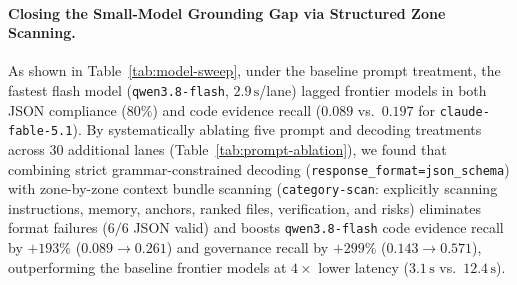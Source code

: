 \documentclass[11pt]{article}
\begin{document}
\paragraph{Closing the Small-Model Grounding Gap via Structured Zone Scanning.}
As shown in Table~\ref{tab:model-sweep}, under the baseline prompt treatment, the fastest flash model (\texttt{qwen3.8-flash}, $2.9\,\text{s}$/lane) lagged frontier models in both JSON compliance ($80\%$) and code evidence recall ($0.089$ vs.\ $0.197$ for \texttt{claude-fable-5.1}). By systematically ablating five prompt and decoding treatments across 30 additional lanes (Table~\ref{tab:prompt-ablation}), we found that combining strict grammar-constrained decoding (\texttt{response\_format=json\_schema}) with zone-by-zone context bundle scanning (\texttt{category-scan}: explicitly scanning instructions, memory, anchors, ranked files, verification, and risks) eliminates format failures ($6/6$ JSON valid) and boosts \texttt{qwen3.8-flash} code evidence recall by $+193\%$ ($0.089 \to 0.261$) and governance recall by $+299\%$ ($0.143 \to 0.571$), outperforming the baseline frontier models at $4\times$ lower latency ($3.1\,\text{s}$ vs.\ $12.4\,\text{s}$).

\begin{table}[t]
\centering
\caption{Prompt treatment and structured decoding ablation on \texttt{qwen/qwen3.8-flash} across the 6-task suite.}
\label{tab:prompt-ablation}
\end{table}
\end{document}
